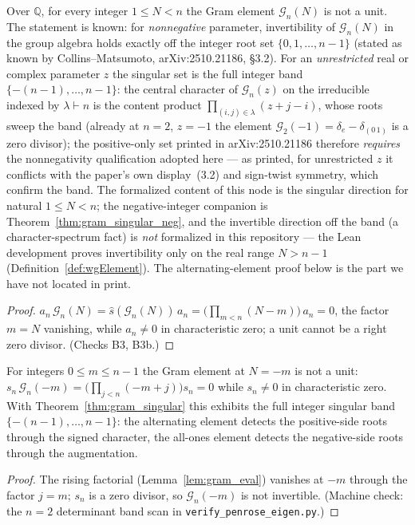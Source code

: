 \begin{theorem}\label{thm:gram_singular}
\leanok
{}
Over $\mathbb{Q}$, for every integer $1\le N<n$ the Gram element
$\mathcal G_n(N)$ is not a unit. The statement is known: for
\emph{nonnegative} parameter, invertibility of $\mathcal G_n(N)$ in the
group algebra holds exactly off the integer root set $\{0,1,\dots,n-1\}$
(stated as known by Collins--Matsumoto, arXiv:2510.21186, \S3.2). For an
\emph{unrestricted} real or complex parameter $z$ the singular set is the
full integer band $\{-(n-1),\dots,n-1\}$: the central character of
$\mathcal G_n(z)$ on the irreducible indexed by $\lambda\vdash n$ is the
content product $\prod_{(i,j)\in\lambda}(z+j-i)$, whose roots sweep the
band (already at $n=2$, $z=-1$ the element
$\mathcal G_2(-1)=\delta_e-\delta_{(0\,1)}$ is a zero divisor); the
positive-only set printed in arXiv:2510.21186 therefore \emph{requires}
the nonnegativity qualification adopted here --- as printed, for
unrestricted $z$ it conflicts with the paper's own display~(3.2) and
sign-twist symmetry, which confirm the band. The formalized content of this node
is the singular direction for natural $1\le N<n$; the negative-integer
companion is Theorem~\ref{thm:gram_singular_neg}, and the invertible
direction off the band (a character-spectrum fact) is \emph{not}
formalized in this repository --- the Lean development proves
invertibility only on the real range $N>n-1$
(Definition~\ref{def:wgElement}). The alternating-element proof below is
the part we have not located in print.
\end{theorem}
\begin{proof}
\leanok
{}
$a_n\,\mathcal G_n(N)=\hat s(\mathcal G_n(N))\,a_n
=\bigl(\prod_{m<n}(N-m)\bigr)\,a_n=0$, the factor $m=N$ vanishing, while
$a_n\neq0$ in characteristic zero; a unit cannot be a right zero divisor.
(Checks B3, B3b.)
\end{proof}

\begin{theorem}\label{thm:gram_singular_neg}
\leanok
{}
For integers $0\le m\le n-1$ the Gram element at $N=-m$ is not a unit:
$s_n\,\mathcal G_n(-m) = \bigl(\textstyle\prod_{j<n}(-m+j)\bigr)s_n = 0$
while $s_n\ne 0$ in characteristic zero. With
Theorem~\ref{thm:gram_singular} this exhibits the full integer singular
band $\{-(n-1),\dots,n-1\}$: the alternating element detects the
positive-side roots through the signed character, the all-ones element
detects the negative-side roots through the augmentation.
\end{theorem}
\begin{proof}
\leanok
{}
The rising factorial (Lemma~\ref{lem:gram_eval}) vanishes at $-m$ through
the factor $j=m$; $s_n$ is a zero divisor, so $\mathcal G_n(-m)$ is not
invertible. (Machine check: the $n=2$ determinant band scan in
\texttt{verify\_penrose\_eigen.py}.)
\end{proof}

